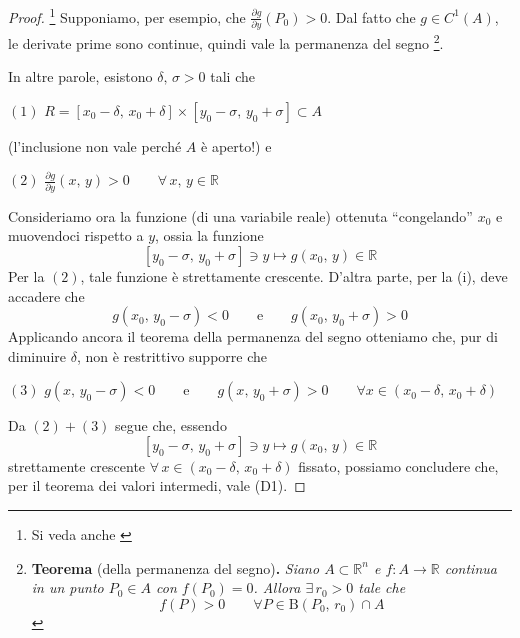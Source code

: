 \begin{proof}\footnote{Si veda anche \cite{Conti1993}}
Supponiamo, per esempio, che $\frac{\partial g}{\partial y} (P_0) > 0$. Dal fatto che $g \in C^1(A)$, le derivate prime sono continue, quindi vale la permanenza del segno \footnote{
\textbf{Teorema }\textnormal{(della permanenza del segno)}\textbf{.}\textit{
Siano $A \subset \mathbb{R}^n$ e $f : A \longrightarrow \mathbb{R}$ continua in un punto $P_0 \in A$ con $f(P_0) = 0$. Allora $\exists \, r_0 > 0$ tale che
$$
f(P) > 0 \qquad \forall P \in \mathrm{B}(P_0,\,r_0) \cap A
$$
}}.
\begin{center}
\def\svgwidth{10cm}

\end{center}
In altre parole, esistono $\delta,\,\sigma > 0$ tali che
\begin{center}
$\mathrm{(1)}$
\hfill
$\displaystyle
R = [x_0 - \delta,\, x_0 + \delta] \times [y_0 - \sigma,\, y_0 + \sigma] \subset A
$
\hfill \null \\
\end{center}
(l'inclusione non vale perché $A$ è aperto!) e
\begin{center}
$\mathrm{(2)}$
\hfill
$\displaystyle
\frac{\partial g}{\partial y}(x,\,y) > 0 \qquad \forall \, x,\,y \in \mathbb{R}
$
\hfill \null \\
\end{center}
Consideriamo ora la funzione (di una variabile reale) ottenuta ``congelando'' $x_0$ e muovendoci rispetto a $y$, ossia la funzione
$$
[y_0-\sigma,\,y_0+\sigma] \ni y \longmapsto g(x_0,\,y) \in \mathbb{R}
$$
Per la $\mathrm{(2)}$, tale funzione è strettamente crescente. D'altra parte, per la (i), deve accadere che
$$
g(x_0,\,y_0-\sigma) < 0 \qquad \text{e} \qquad g(x_0,\,y_0+\sigma) > 0
$$
Applicando ancora il teorema della permanenza del segno otteniamo che, pur di diminuire $\delta$, non è restrittivo supporre che
\begin{center}
$\mathrm{(3)}$
\hfill
$\displaystyle
g(x,\,y_0-\sigma) < 0 \qquad \text{e} \qquad g(x,\,y_0+\sigma) > 0
\qquad \forall x \in (x_0-\delta,\, x_0+\delta)
$
\hfill \null \\
\end{center}
Da $\mathrm{(2)}+\mathrm{(3)}$ segue che, essendo
$$
[y_0-\sigma,\,y_0+\sigma] \ni y \longmapsto g(x_0,\,y) \in \mathbb{R}
$$
strettamente crescente $\forall \, x \in (x_0-\delta,\, x_0+\delta)$ fissato, possiamo concludere che, per il teorema dei valori intermedi, vale (D1).


\end{proof}
